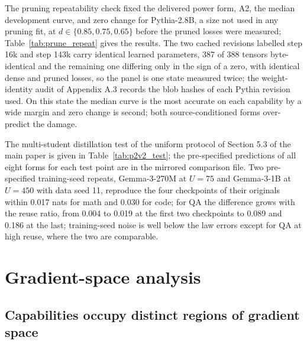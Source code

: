 The pruning repeatability check fixed the delivered power form, A2,
the median development curve, and zero change for Pythia-2.8B, a size
not used in any pruning fit, at $d\in\{0.85,0.75,0.65\}$ before the pruned losses were measured; Table~\ref{tab:prune_repeat} gives the results. The two
cached revisions labelled step 16k and step 143k carry identical learned parameters, 387 of 388 tensors byte-identical and the remaining one differing only in the sign of a zero, with identical dense and pruned losses, so the panel is one state measured twice; the
weight-identity audit of Appendix A.3 records
the blob hashes of each Pythia revision used. On this state the
median curve is the most accurate on each capability by a wide margin
and zero change is second; both source-conditioned forms over-predict
the damage.



The multi-student distillation test of the uniform protocol of Section 5.3 of the main paper is given in Table~\ref{tab:p2v2_test}; the
pre-specified predictions of all eight forms for each test point are in the
mirrored comparison file. Two pre-specified training-seed repeats, Gemma-3-270M at $U{=}75$ and Gemma-3-1B at $U{=}450$ with data seed 11, reproduce the four checkpoints of their originals within 0.017 nats
for math and 0.030 for code; for QA the difference grows with the
reuse ratio, from 0.004 to 0.019 at the first two checkpoints to 0.089
and 0.186 at the last; training-seed noise is well below the law
errors except for QA at high reuse, where the two are comparable.







\FloatBarrier

\section{Gradient-space analysis}
\label{sec:supp_gradient}

\subsection{Capabilities occupy distinct regions of gradient space}
\label{sec:regions}

